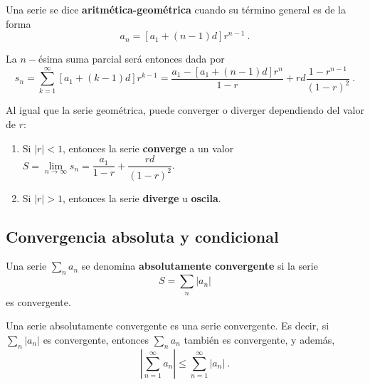 \begin{defi} 
    Una serie se dice \textbf{aritmética-geométrica} cuando su término general es de la forma 
    \begin{equation}
        a_n = [a_1 + (n-1)d] r^{n-1} \ .
    \end{equation}

    La $n-$ésima suma parcial será entonces dada por 
    \begin{equation}
        s_n = \sum_{k=1}^\infty [a_1 + (k-1)d]r^{k-1} = \frac{a_1 - [a_1 + (n-1)d]r^n}{1-r} + rd \frac{1-r^{n-1}}{(1-r)^2} \ .
    \end{equation}

    Al igual que la serie geométrica, puede converger o diverger dependiendo del valor de $r$:
    \begin{enumerate}
        \item Si $|r| < 1$, entonces la serie \textbf{converge} a un valor $S = \lim\limits_{n\to\infty} s_n = \dfrac{a_1}{1-r} + \dfrac{rd}{(1-r)^2}$.
        \item Si $|r| > 1$, entonces la serie \textbf{diverge} u \textbf{oscila}.
    \end{enumerate}
\end{defi}



\subsection{Convergencia absoluta y condicional}

\begin{defi} 
    Una serie $\sum\limits_n a_n$ se denomina \textbf{absolutamente convergente} si la serie
    \begin{equation}
        S = \sum_n |a_n| 
    \end{equation}
    es convergente.
\end{defi}

\begin{teorema}
    Una serie absolutamente convergente es una serie convergente. Es decir, si $\sum\limits_n |a_n|$ es convergente, entonces $\sum\limits_n a_n$ también es convergente, y además,
    \begin{equation}
        \left| \sum_{n=1}^\infty a_n \right| \leq \sum_{n=1}^\infty |a_n| \ .
    \end{equation}
\end{teorema}

